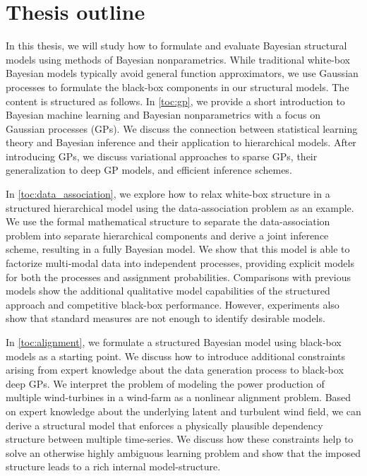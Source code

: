 \section{Thesis outline}
In this thesis, we will study how to formulate and evaluate Bayesian structural models using methods of Bayesian nonparametrics.
While traditional white-box Bayesian models typically avoid general function approximators, we use Gaussian processes to formulate the black-box components in our structural models.
The content is structured as follows.
In \cref{toc:gp}, we provide a short introduction to Bayesian machine learning and Bayesian nonparametrics with a focus on Gaussian processes (GPs).
We discuss the connection between statistical learning theory and Bayesian inference and their application to hierarchical models.
After introducing GPs, we discuss variational approaches to sparse GPs, their generalization to deep GP models, and efficient inference schemes.

In \cref{toc:data_association}, we explore how to relax white-box structure in a structured hierarchical model using the data-association problem as an example.
We use the formal mathematical structure to separate the data-association problem into separate hierarchical components and derive a joint inference scheme, resulting in a fully Bayesian model.
We show that this model is able to factorize multi-modal data into independent processes, providing explicit models for both the processes and assignment probabilities.
Comparisons with previous models show the additional qualitative model capabilities of the structured approach and competitive black-box performance.
However, experiments also show that standard measures are not enough to identify desirable models.

In \cref{toc:alignment}, we formulate a structured Bayesian model using black-box models as a starting point.
We discuss how to introduce additional constraints arising from expert knowledge about the data generation process to black-box deep GPs.
We interpret the problem of modeling the power production of multiple wind-turbines in a wind-farm as a nonlinear alignment problem.
Based on expert knowledge about the underlying latent and turbulent wind field, we can derive a structural model that enforces a physically plausible dependency structure between multiple time-series.
We discuss how these constraints help to solve an otherwise highly ambiguous learning problem and show that the imposed structure leads to a rich internal model-structure.

